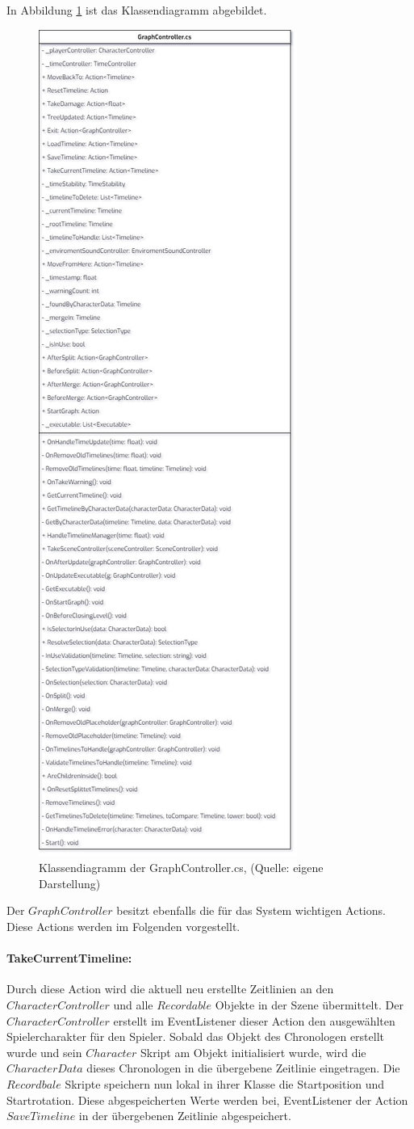 In Abbildung \ref{fig:graphController-cs} ist das Klassendiagramm abgebildet.
\begin{figure}[ht]
\centering
\includegraphics[width=0.5\linewidth]{content/pictures/GraphController.jpg}
\caption{Klassendiagramm der GraphController.cs, (Quelle: eigene Darstellung)}
\label{fig:graphController-cs}
\end{figure}

Der $GraphController$ besitzt ebenfalls die für das System wichtigen Actions. Diese Actions werden im Folgenden vorgestellt.

\paragraph{TakeCurrentTimeline:}
Durch diese Action wird die aktuell neu erstellte Zeitlinien an den $CharacterController$ und alle $Recordable$ Objekte in der Szene übermittelt. Der $CharacterController$ erstellt im EventListener dieser Action den ausgewählten Spielercharakter für den Spieler. Sobald das Objekt des Chronologen erstellt wurde und sein $Character$ Skript am Objekt initialisiert wurde, wird die $CharacterData$ dieses Chronologen in die übergebene Zeitlinie eingetragen. 
Die $Recordbale$ Skripte speichern nun lokal in ihrer Klasse die Startposition und Startrotation. Diese abgespeicherten Werte werden bei, EventListener der Action $SaveTimeline$ in der übergebenen Zeitlinie abgespeichert.

